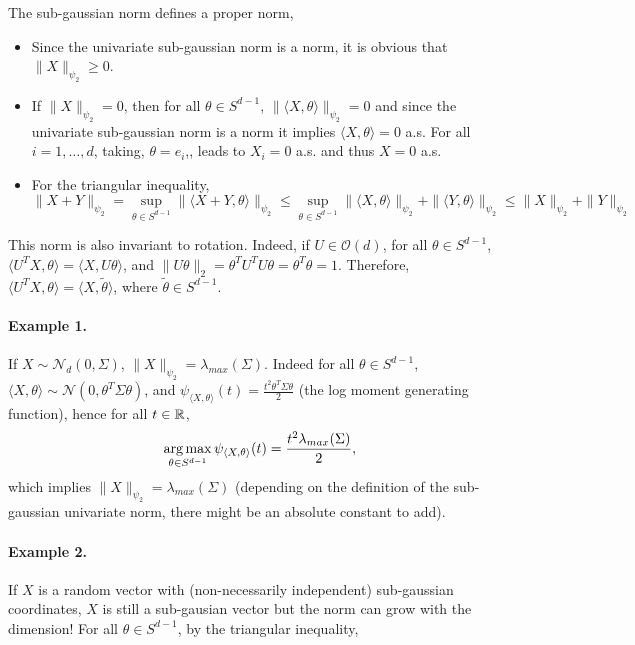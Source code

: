 \documentclass{article}
\begin{document}
The sub-gaussian norm defines a proper norm,
\begin{itemize}
\item Since the univariate sub-gaussian norm is a norm, it is obvious that $\|X\|_{\psi_2}
  \geq 0$.
\item If $\|X\|_{\psi_2} = 0$, then for all $\theta \in S^{d-1}$, $\|\langle
  X,\theta \rangle\|_{\psi_2} = 0$ and since the univariate sub-gaussian norm is a
  norm it implies $\langle X,\theta \rangle = 0$ a.s. For all $i=1,\ldots,d$,
  taking, $\theta = e_i$,, leads to  $X_i = 0$ a.s. and thus $X=0$ a.s.
\item For the triangular inequality, $$\|X + Y\|_{\psi_2} =\sup _{\theta \in S^{d-1}}\|\langle X+Y,
  \theta\rangle\|_{\psi_{2}} \leq \sup _{\theta \in S^{d-1}}\|\langle X,
  \theta\rangle\|_{\psi_{2}} + \|\langle Y,\theta\rangle\|_{\psi_{2}} \leq \|X\|_{\psi_2} + \|Y\|_{\psi_2}$$ 
\end{itemize}

This norm is also invariant to rotation. Indeed, if $U \in \mathcal{O}(d)$, for
all $\theta \in S^{d-1}$, $\langle U^TX,\theta \rangle = \langle X,U\theta
\rangle$, and $\|U\theta\|_2 = \theta^TU^TU\theta = \theta^T\theta = 1$.
Therefore, $\langle U^TX,\theta \rangle = \langle X,\tilde{\theta}\rangle$,
where $\tilde{\theta} \in S^{d-1}$. 

\paragraph{Example 1.} If $X \sim \mathcal{N}_d(0,\Sigma)$, $\|X\|_{\psi_2} = \lambda_{max}(\Sigma)$. Indeed for all $\theta \in S^{d-1}$, $\langle X,\theta \rangle
\sim \mathcal{N}(0,\theta^T\Sigma\theta)$, and $\psi_{\langle X,\theta
  \rangle}(t) = \frac{t^2\theta^T\Sigma\theta}{2}$ (the log moment generating function), hence for all $t \in \mathbb{R}$, $$\operatorname*{arg\,max}_{\theta \in
  S^{d-1}} \psi_{\langle X,\theta\rangle}(t) =  \frac{t^2
  \lambda_{max}(\Sigma)}{2},$$ which implies $\|X\|_{\psi_2} =
\lambda_{max}(\Sigma)$ (depending on the definition of the sub-gaussian
univariate norm, there might be an absolute constant to add).

\paragraph{Example 2.} If $X$ is a random vector with (non-necessarily
independent) sub-gaussian coordinates, $X$ is still a sub-gausian vector but the
norm can grow with the dimension! For all $\theta \in S^{d-1}$, by the
triangular inequality,
\end{document}
